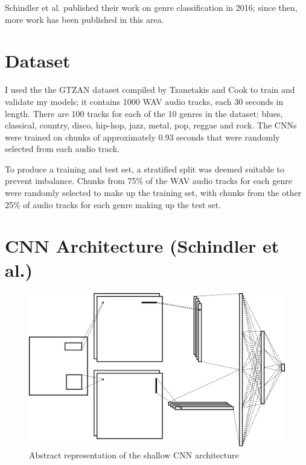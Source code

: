 \documentclass[conference]{IEEEtran}
\begin{document}
Schindler et al. published their work on genre classification in 2016; since then, more work has been published in this area.




\section{Dataset}

I used the the GTZAN dataset compiled by Tzanetakis and Cook \cite{TzanetakisCook} to train and validate my models; it contains 1000 WAV audio tracks, each 30 seconds in length.
There are 100 tracks for each of the 10 genres in the dataset: blues, classical, country, disco, hip-hop, jazz, metal, pop, reggae and rock.
The CNNs were trained on chunks of approximately 0.93 seconds that were randomly selected from each audio track.

To produce a training and test set, a stratified split was deemed suitable to prevent imbalance.
Chunks from 75\% of the WAV audio tracks for each genre were randomly selected to make up the training set, with chunks from the other 25\% of audio tracks for each genre making up the test set.

\section{CNN Architecture (Schindler et al.)}

\begin{figure}[htbp]
    \centerline{\includegraphics[width=\columnwidth]{architecture.jpg}}
    \caption{Abstract representation of the shallow CNN architecture}
    \label{architecture}
\end{figure}
\end{document}
